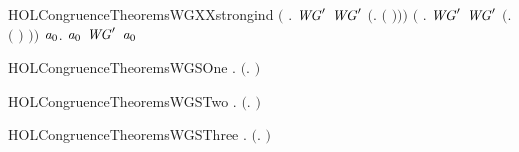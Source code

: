 \begin{SaveVerbatim}{HOLCongruenceTheoremsWGXXstrongind}
       \ensuremath{(}\HOLSymConst{\HOLTokenForall{}} .   \HOLSymConst{\HOLTokenConj{}} \ensuremath{\HOLBoundVar{WG}\sp{\prime}}  \HOLSymConst{\HOLTokenImp{}} \ensuremath{\HOLBoundVar{WG}\sp{\prime}} \ensuremath{(}\HOLTokenLambda{}.   \ensuremath{(} \ensuremath{)}\ensuremath{)}\ensuremath{)} \HOLSymConst{\HOLTokenConj{}}
       \ensuremath{(}\HOLSymConst{\HOLTokenForall{}} .   \HOLSymConst{\HOLTokenConj{}} \ensuremath{\HOLBoundVar{WG}\sp{\prime}}  \HOLSymConst{\HOLTokenImp{}} \ensuremath{\HOLBoundVar{WG}\sp{\prime}} \ensuremath{(}\HOLTokenLambda{}.  \ensuremath{(} \ensuremath{)} \ensuremath{)}\ensuremath{)} \HOLSymConst{\HOLTokenImp{}}
       \HOLSymConst{\HOLTokenForall{}}\ensuremath{\HOLBoundVar{a}\sb{\mathrm{0}}}.  \ensuremath{\HOLBoundVar{a}\sb{\mathrm{0}}} \HOLSymConst{\HOLTokenImp{}} \ensuremath{\HOLBoundVar{WG}\sp{\prime}} \ensuremath{\HOLBoundVar{a}\sb{\mathrm{0}}}
\end{SaveVerbatim}
\newcommand{\HOLCongruenceTheoremsWGXXstrongind}{\UseVerbatim{HOLCongruenceTheoremsWGXXstrongind}}
\begin{SaveVerbatim}{HOLCongruenceTheoremsWGSOne}
\HOLTokenTurnstile{} \HOLSymConst{\HOLTokenForall{}}.  \ensuremath{(}\HOLTokenLambda{}. \HOLSymConst{\ensuremath{\ldotp}}\ensuremath{)}
\end{SaveVerbatim}
\newcommand{\HOLCongruenceTheoremsWGSOne}{\UseVerbatim{HOLCongruenceTheoremsWGSOne}}
\begin{SaveVerbatim}{HOLCongruenceTheoremsWGSTwo}
\HOLTokenTurnstile{} \HOLSymConst{\HOLTokenForall{}}.  \ensuremath{(}\HOLTokenLambda{}. \ensuremath{)}
\end{SaveVerbatim}
\newcommand{\HOLCongruenceTheoremsWGSTwo}{\UseVerbatim{HOLCongruenceTheoremsWGSTwo}}
\begin{SaveVerbatim}{HOLCongruenceTheoremsWGSThree}
\HOLTokenTurnstile{} \HOLSymConst{\HOLTokenForall{}} .   \HOLSymConst{\HOLTokenImp{}}  \ensuremath{(}\HOLTokenLambda{}. \HOLSymConst{\ensuremath{\ldotp}} \ensuremath{)}
\end{SaveVerbatim}
